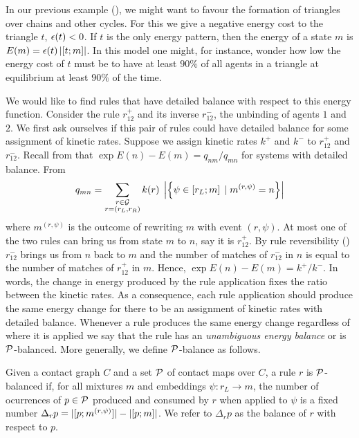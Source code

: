 In our previous example (),
we might want to favour the formation of
triangles over chains and other cycles.
For this we give a negative energy cost to the triangle $t$,
\ie $\epsilon(t) < 0$.
If $t$ is the only energy pattern,
then the energy of a state $m$ is
$E(m) = \epsilon(t) \left\lvert \left[t;m\right] \right\rvert$.
In this model one might, for instance,
wonder how low the energy cost of $t$ must be
to have at least $90\%$ of all agents in a triangle
at equilibrium at least $90\%$ of the time.

We would like to find rules that have detailed balance
with respect to this energy function.
Consider the rule $r^+_{12}$ and its inverse $r^-_{12}$,
the unbinding of agents $1$ and $2$.
We first ask ourselves if this pair of rules
could have detailed balance
for some assignment of kinetic rates.
Suppose we assign kinetic rates $k^+$ and $k^-$
to $r^+_{12}$ and $r^-_{12}$.
Recall from  that $\exp{E(n)-E(m)} = q_{nm}/q_{mn}$
for systems with detailed balance.
From 
\[ q_{mn} = \sum_{\substack{r \in \mathcal{G}\\r = \left(r_L,r_R\right)}}
   k(r) \; \left\lvert \left\{ \psi \in \left[r_L;m\right] \; | \; m^{(r,\psi)} = n \right\} \right\rvert
\]
where $m^{(r,\psi)}$ is the outcome of rewriting $m$
with event $(r,\psi)$.
At most one of the two rules
can bring us from state $m$ to $n$,
say it is $r^+_{12}$.
By rule reversibility ()
$r^-_{12}$ brings us from $n$ back to $m$
and the number of matches of $r^-_{12}$ in $n$
is equal to the number of matches of $r^+_{12}$ in $m$.
Hence, $\exp{E(n)-E(m)} = k^+/k^-$.
In words, the change in energy produced by the rule application
fixes the ratio between the kinetic rates.
As a consequence,
each rule application should produce the same energy change
for there to be an assignment of kinetic rates with detailed balance.
Whenever a rule produces the same energy change
regardless of where it is applied
we say that the rule has an \emph{unambiguous energy balance}
or is $\mathcal{P}$-balanced.
More generally, we define $\mathcal{P}$-balance as follows.

\begin{definition}
  Given a contact graph $C$
  and a set $\mathcal{P}$ of contact maps over $C$,
  a rule $r$ is $\mathcal{P}$-balanced
  if, for all mixtures $m$ and embeddings $\psi: r_L \to m$,
  the number of ocurrences of $p \in \mathcal{P}$
  produced and consumed by $r$ when applied to $\psi$
  is a fixed number
  $\Delta_r p = |[p;m^{(r,\psi)}]| - \left\lvert \left[p;m\right] \right\rvert$.
  We refer to $\Delta_r p$ as the balance of $r$ with respect to $p$.
\end{definition}


